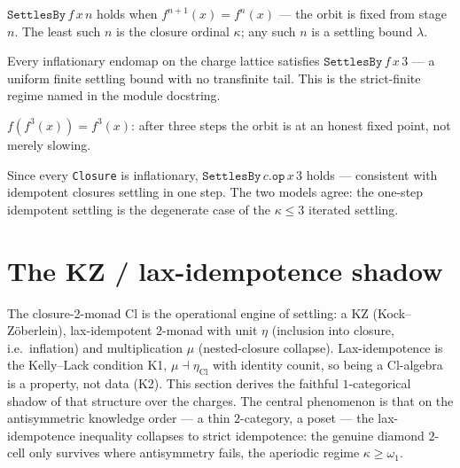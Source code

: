 \begin{definition}\label{def:settles-by}\leanok{}
$\texttt{SettlesBy}\,f\,x\,n$ holds when $f^{n+1}(x) = f^n(x)$ --- the orbit is
fixed from stage $n$. The least such $n$ is the closure ordinal $\kappa$; any
such $n$ is a settling bound $\lambda$.
\end{definition}

\begin{theorem}\label{thm:strict-finite}\leanok{}
Every inflationary endomap on the charge lattice satisfies
$\texttt{SettlesBy}\,f\,x\,3$ --- a uniform finite settling bound with no
transfinite tail. This is the strict-finite regime named in the module
docstring.
\end{theorem}

\begin{theorem}\label{thm:settled-fixed}\leanok{}
$f(f^3(x)) = f^3(x)$: after three steps the orbit is at an honest fixed point,
not merely slowing.
\end{theorem}

\begin{corollary}\label{cor:closure-strict-finite}\leanok{}
Since every \texttt{Closure} is inflationary, $\texttt{SettlesBy}\,c.\texttt{op}\,x\,3$
holds --- consistent with idempotent closures settling in one step. The two
models agree: the one-step idempotent settling is the degenerate case of the
$\kappa \le 3$ iterated settling.
\end{corollary}

\section{The KZ / lax-idempotence shadow}

The closure-2-monad $\mathrm{Cl}$ is the operational engine of settling: a KZ
(Kock--Z\"oberlein), lax-idempotent $2$-monad with unit $\eta$ (inclusion into
closure, i.e.\ inflation) and multiplication $\mu$ (nested-closure collapse).
Lax-idempotence is the Kelly--Lack condition K1, $\mu \dashv \eta_{\mathrm{Cl}}$
with identity counit, so being a $\mathrm{Cl}$-algebra is a property, not data
(K2). This section derives the faithful $1$-categorical shadow of that structure
over the charges. The central phenomenon is that on the antisymmetric knowledge
order --- a thin $2$-category, a poset --- the lax-idempotence inequality
collapses to strict idempotence: the genuine diamond $2$-cell only survives where
antisymmetry fails, the aperiodic regime $\kappa \ge \omega_1$.


